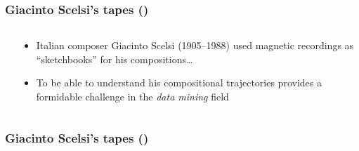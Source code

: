 \setcounter{ms}{0}
\begin{frame}
    \frametitle<+- | alert@+->{Giacinto Scelsi's tapes ()}
    
    \begin{columns}[T]
        \begin{column}{0.3\textwidth}
        \end{column}
        \begin{column}{0.7\textwidth}
            \begin{itemize}[<+- | alert@+->]
								\item Italian composer Giacinto Scelsi (1905--1988)
												used magnetic recordings as ``sketchbooks''
												for his compositions\ldots
								\item To be able to understand his compositional trajectories 
												provides a formidable challenge in the \emph{data
												mining} field
            \end{itemize}
        \end{column}
    \end{columns}

\end{frame}

\begin{frame}
    \frametitle{Giacinto Scelsi's tapes ()}
    
    \begin{center}
    \end{center}

\end{frame}


